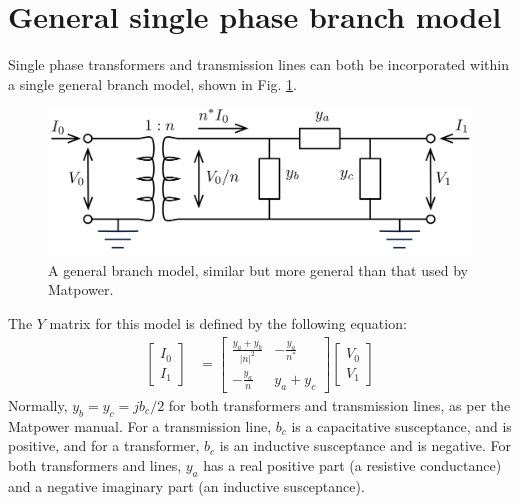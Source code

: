 \documentclass[11pt]{article}
\begin{document}
\section{General single phase branch model}
\label{SEC_GEN_BRANCH_MODEL}
Single phase transformers and transmission lines can both be incorporated within a single general branch model, shown in Fig. \ref{FIG_GEN_BRANCH_MODEL}.
\begin{figure}[!h]
	\begin{center}
		\includegraphics[width=(9cm)]{branch.png}
	\end{center}
	\caption{
		A general branch model, similar but more general than that used by {\sc Matpower}.
	}
	\label{FIG_GEN_BRANCH_MODEL}
\end{figure}
The $Y$ matrix for this model is defined by the following equation:
\begin{align}
	\begin{bmatrix}I_0 \\ I_1\end{bmatrix} &=
	\begin{bmatrix}\frac{y_a + y_b}{|n|^2} & -\frac{y_a}{n^*} \\ -\frac{y_a}{n} & y_a + y_c \end{bmatrix}
	\begin{bmatrix}V_0 \\ V_1\end{bmatrix}
\end{align}
Normally, $y_b = y_c = jb_c/2$ for both transformers and transmission lines, as per the {\sc Matpower} manual. For a transmission line, $b_c$ is a capacitative susceptance, and is positive, and for a transformer, $b_c$ is an inductive susceptance and is negative. For both transformers and lines, $y_a$ has a real positive part (a resistive conductance) and a negative imaginary part (an inductive susceptance).
\end{document}
